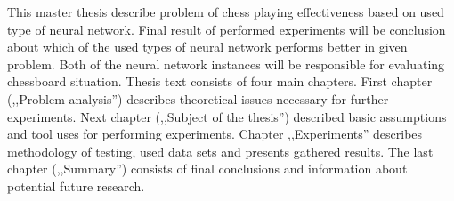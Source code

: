 This master thesis describe problem of chess playing effectiveness based on used type of neural network. Final result of performed experiments will be conclusion about which of the used types of neural network performs better in given problem. Both of the neural network instances will be responsible for evaluating chessboard situation. Thesis text consists of four main chapters. First chapter (,,Problem analysis'') describes theoretical issues necessary for further experiments. Next chapter (,,Subject of the thesis'') described basic assumptions and tool uses for performing experiments. Chapter ,,Experiments'' describes methodology of testing, used data sets and presents gathered results. The last chapter (,,Summary'') consists of final conclusions and information about potential future research.


